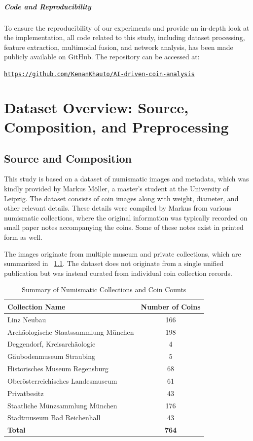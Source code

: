 \documentclass[nolibertine, english, algorithm, nomencl, minted]{ttlab-qualify}
\begin{document}
\paragraph{Code and Reproducibility}
To ensure the reproducibility of our experiments and provide an in-depth look at the implementation, 
all code related to this study, including dataset processing, feature extraction, multimodal fusion, and network analysis, 
has been made publicly available on GitHub. 
The repository can be accessed at: \begin{small}
    \begin{center} \href{https://github.com/KenanKhauto/AI-driven-coin-analysis}{\texttt{https://github.com/KenanKhauto/AI-driven-coin-analysis}}\end{center}
\end{small}

\chapter{Dataset Overview: Source, Composition, and Preprocessing}
\section{Source and Composition}
This study is based on a dataset of numismatic images and metadata, which was kindly provided by Markus Möller, 
a master’s student at the University of Leipzig. The dataset consists of coin images along with weight, diameter, 
and other relevant details. These details were compiled by Markus from various numismatic collections, where the 
original information was typically recorded on small paper notes accompanying the coins. Some of these notes exist 
in printed form as well.

The images originate from multiple museum and private collections, which are summarized in ~\ref{tab:collection_summary}. 
The dataset does not originate from a single unified publication but was instead curated from individual coin 
collection records.

\begin{table}[H]
\centering
\caption{Summary of Numismatic Collections and Coin Counts}
\label{tab:collection_summary}
\begin{tabular}{|l|c|}
\hline
\textbf{Collection Name} & \textbf{Number of Coins} \\
\hline
Linz Neubau & 166 \\
Archäologische Staatssammlung München & 198 \\
Deggendorf, Kreisarchäologie & 4 \\
Gäubodenmuseum Straubing & 5 \\
Historisches Museum Regensburg & 68 \\
Oberösterreichisches Landesmuseum & 61 \\
Privatbesitz & 43 \\
Staatliche Münzsammlung München & 176 \\
Stadtmuseum Bad Reichenhall & 43 \\
\hline
\textbf{Total} & \textbf{764} \\
\hline
\end{tabular}
\end{table}
\end{document}
